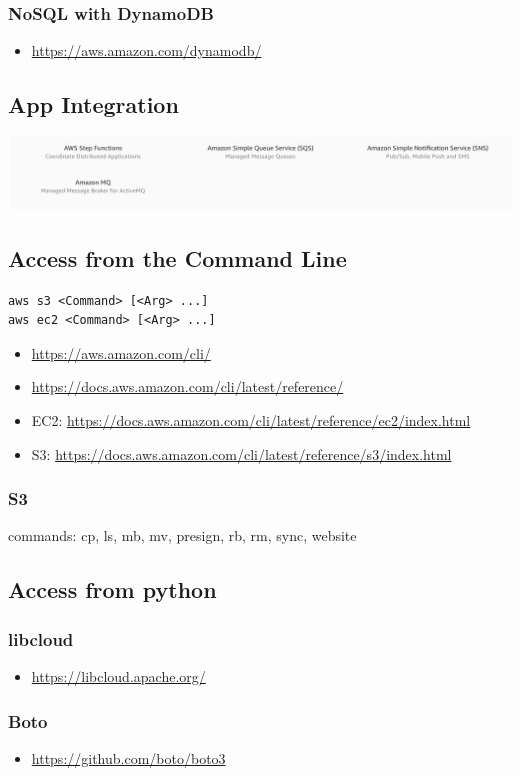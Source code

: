 \subsubsection{NoSQL with DynamoDB}

\begin{itemize}
\item
  \url{https://aws.amazon.com/dynamodb/}
\end{itemize}

\subsection{App Integration}

\includegraphics[width=0.8\columnwidth]{images/aws-app-integration.png}

\subsection{Access from the Command Line}

\begin{lstlisting}
aws s3 <Command> [<Arg> ...]
aws ec2 <Command> [<Arg> ...]
\end{lstlisting}

\begin{itemize}
\item
  \url{https://aws.amazon.com/cli/}
\item
  \url{https://docs.aws.amazon.com/cli/latest/reference/}
\item
  EC2:
  \url{https://docs.aws.amazon.com/cli/latest/reference/ec2/index.html}
\item
  S3:
  \url{https://docs.aws.amazon.com/cli/latest/reference/s3/index.html}
\end{itemize}

\subsubsection{S3}

commands: cp, ls, mb, mv, presign, rb, rm, sync, website

\subsection{Access from python}

\subsubsection{libcloud}

\begin{itemize}
\item
  \url{https://libcloud.apache.org/}
\end{itemize}

\subsubsection{Boto}

\begin{itemize}
\item
  \url{https://github.com/boto/boto3}
\end{itemize}

